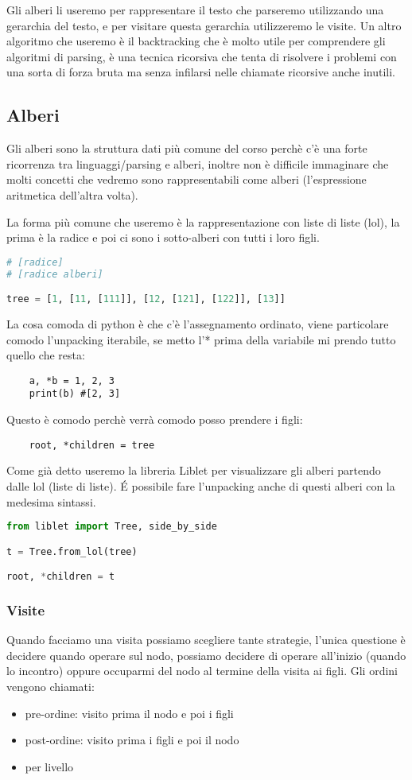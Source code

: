 Gli alberi li useremo per rappresentare il testo che parseremo utilizzando una gerarchia del testo, e per visitare questa gerarchia utilizzeremo le visite.
Un altro algoritmo che useremo è il backtracking che è molto utile per comprendere gli algoritmi di parsing, è una tecnica ricorsiva che tenta di risolvere i problemi con una sorta di forza bruta ma senza infilarsi nelle chiamate ricorsive anche inutili.

\subsection{Alberi}
Gli alberi sono la struttura dati più comune del corso perchè c'è una forte ricorrenza tra linguaggi/parsing e alberi, inoltre non è difficile immaginare che molti concetti che vedremo sono rappresentabili come alberi (l'espressione aritmetica dell'altra volta).

La forma più comune che useremo è la rappresentazione con liste di liste (lol), la prima è la radice e poi ci sono i sotto-alberi con tutti i loro figli.
\begin{lstlisting}[language=Python]
# [radice] 
# [radice alberi]

tree = [1, [11, [111]], [12, [121], [122]], [13]]
\end{lstlisting}

La cosa comoda di python è che c'è l'assegnamento ordinato, viene particolare comodo l'unpacking iterabile, se metto l'* prima della variabile mi prendo tutto quello che resta:
\begin{lstlisting}
    a, *b = 1, 2, 3
    print(b) #[2, 3]
\end{lstlisting}

Questo è comodo perchè verrà comodo posso prendere i figli:
\begin{lstlisting}
    root, *children = tree
\end{lstlisting}

Come già detto useremo la libreria Liblet per visualizzare gli alberi partendo dalle lol (liste di liste).
\'E possibile fare l'unpacking anche di questi alberi con la medesima sintassi.
\begin{lstlisting}[language=Python]
from liblet import Tree, side_by_side

t = Tree.from_lol(tree)

root, *children = t
\end{lstlisting}

\subsubsection{Visite}
Quando facciamo una visita possiamo scegliere tante strategie, l'unica questione è decidere quando operare sul nodo, possiamo decidere di operare all'inizio (quando lo incontro) oppure occuparmi del nodo al termine della visita ai figli. Gli ordini vengono chiamati:
\begin{itemize}
    \item pre-ordine: visito prima il nodo e poi i figli
    \item post-ordine: visito prima i figli e poi il nodo
    \item per livello
\end{itemize}

